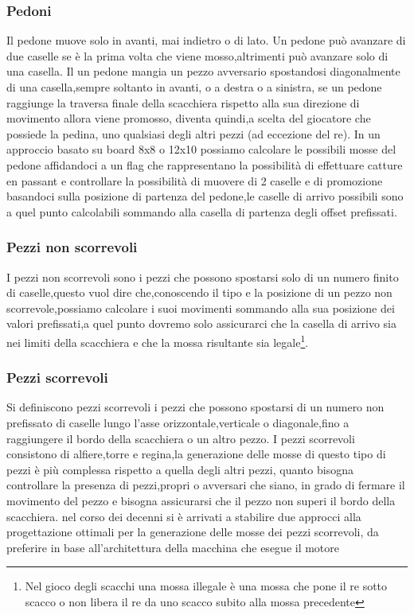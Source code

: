\subsubsection{Pedoni}
Il pedone muove solo in avanti, mai indietro o di lato. Un pedone può avanzare  di due caselle se è la prima volta che viene mosso,altrimenti può avanzare solo di una casella.
Il un pedone mangia un pezzo avversario spostandosi diagonalmente di una casella,sempre soltanto in avanti, o a destra o a sinistra, se un pedone raggiunge la traversa finale della scacchiera rispetto alla sua direzione di movimento
allora viene promosso, diventa quindi,a scelta del giocatore che possiede la pedina, uno qualsiasi degli altri pezzi  (ad eccezione del re).
In un approccio basato su board 8x8 o 12x10 possiamo calcolare le possibili mosse del pedone affidandoci a un flag che rappresentano la possibilità di effettuare catture en passant e controllare la possibilità 
di muovere di 2 caselle e di promozione basandoci sulla posizione di partenza del pedone,le caselle di arrivo possibili sono a quel punto calcolabili sommando alla casella di partenza degli offset prefissati.



\subsubsection{Pezzi non scorrevoli}
I pezzi non scorrevoli sono i pezzi che possono spostarsi solo di un numero finito di caselle,questo vuol dire che,conoscendo il tipo e la posizione di un pezzo non scorrevole,possiamo calcolare i suoi movimenti
sommando alla sua posizione dei valori prefissati,a quel punto dovremo solo assicurarci che la casella di arrivo sia nei limiti della scacchiera e che la mossa risultante sia legale\footnote{Nel gioco degli scacchi una mossa illegale è una mossa che pone il re sotto scacco o non libera il re da uno scacco subito alla mossa precedente}.

\subsubsection{Pezzi  scorrevoli}
Si definiscono pezzi scorrevoli i pezzi che possono spostarsi di un numero non prefissato di caselle lungo l'asse orizzontale,verticale o diagonale,fino a raggiungere il bordo della scacchiera o un altro pezzo.
I pezzi scorrevoli consistono di alfiere,torre e regina,la generazione delle mosse di questo tipo di pezzi è più complessa rispetto a quella degli altri pezzi, quanto bisogna controllare la presenza di pezzi,propri
o avversari che siano, in grado di fermare il movimento del pezzo e bisogna assicurarsi che il pezzo non superi il bordo della scacchiera.
nel corso  dei decenni si è arrivati a stabilire due approcci alla progettazione ottimali per la generazione delle mosse dei pezzi scorrevoli, 
da preferire in base all'architettura della macchina che esegue il motore

